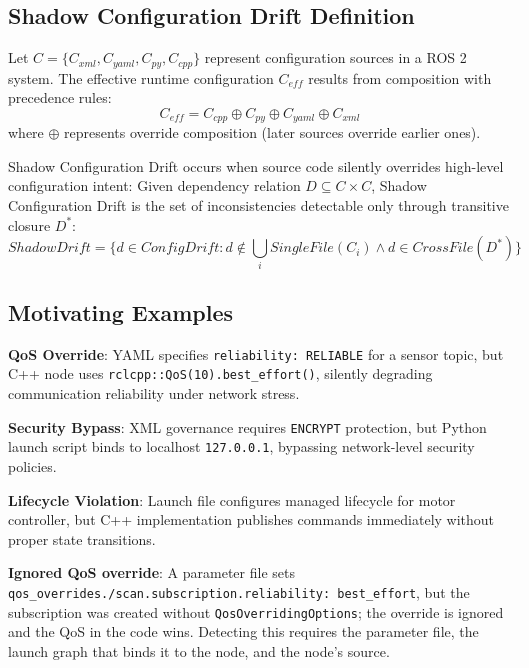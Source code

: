 \documentclass[conference]{IEEEtran}
\newcommand{\code}[1]{\texttt{#1}}
\begin{document}
\subsection{Shadow Configuration Drift Definition}

Let $C = \{C_{xml}, C_{yaml}, C_{py}, C_{cpp}\}$ represent configuration sources in a ROS 2
system. The effective runtime configuration $C_{eff}$ results from composition with precedence
rules:
\begin{equation}
C_{eff} = C_{cpp} \oplus C_{py} \oplus C_{yaml} \oplus C_{xml}
\end{equation}
where $\oplus$ represents override composition (later sources override earlier ones).

Shadow Configuration Drift occurs when source code silently overrides high-level configuration
intent: Given dependency relation $D \subseteq C \times C$, Shadow Configuration Drift is the set
of inconsistencies detectable only through transitive closure $D^*$:
\begin{equation}
\mathit{ShadowDrift} = \Big\{ d \in \mathit{ConfigDrift} : d \notin \bigcup_i \mathit{SingleFile}(C_i)
\wedge d \in \mathit{CrossFile}(D^*) \Big\}
\end{equation}

\subsection{Motivating Examples}

\textbf{QoS Override}: YAML specifies \code{reliability: RELIABLE} for a sensor topic, but C++
node uses \code{rclcpp::QoS(10).best\_effort()}, silently degrading communication reliability
under network stress.

\textbf{Security Bypass}: XML governance requires \code{ENCRYPT} protection, but Python launch
script binds to localhost \code{127.0.0.1}, bypassing network-level security policies.

\textbf{Lifecycle Violation}: Launch file configures managed lifecycle for motor controller, but
C++ implementation publishes commands immediately without proper state transitions.

\textbf{Ignored QoS override}: A parameter file sets
\code{qos\_overrides./scan.subscription.reliability: best\_effort}, but the subscription was
created without \code{QosOverridingOptions}; the override is ignored and the QoS in the code wins.
Detecting this requires the parameter file, the launch graph that binds it to the node, and the
node's source.
\end{document}
